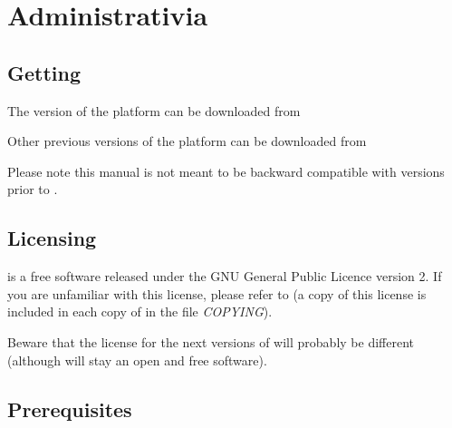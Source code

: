 \chapter{Administrativia}

\section{Getting \vcsnv}
The version \VcsnVersion\xspace of the \vcsn platform can be downloaded
from \\

Other previous versions of the \vcsn platform can be downloaded
from \\

Please note this manual is not meant to be backward compatible with
\vcsn versions prior to \VcsnVersion.

\section{Licensing}
\vcsnv is a free software released under the GNU General
Public Licence version 2. If you are unfamiliar with this license,
please refer to  (a copy of
this license is included in each copy of \vcsn in the file
\emph{COPYING}).

Beware that the license for the next versions of \vcsn will
probably be different (although \vcsn will stay an open and free
software).

\section{Prerequisites}
\label{sec:pre-req}%

